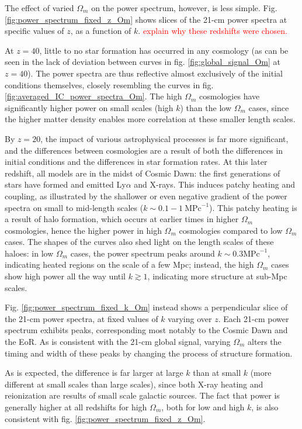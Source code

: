 \documentclass[floats,floatfix,showpacs,amssymb,prd,superscriptaddress,nofootinbib]{revtex4-2} %
\newcommand{\red}{\textcolor{red}}
\begin{document}
The effect of varied $\Omega_m$ on the power spectrum, however, is less simple. Fig. \ref{fig:power_spectrum_fixed_z_Om} shows slices of the 21-cm power spectra at specific values of $z$, as a function of $k$. \red{explain why these redshifts were chosen.}

At $z = 40$, little to no star formation has occurred in any cosmology (as can be seen in the lack of deviation between curves in fig. \ref{fig:global_signal_Om} at $z = 40$). The power spectra are thus reflective almost exclusively of the initial conditions themselves, closely resembling the curves in fig. \ref{fig:averaged_IC_power_spectra_Om}.
The high $\Omega_m$ cosmologies have significantly higher power on small scales (high $k$) than the low $\Omega_m$ cases, since the higher matter density enables more correlation at these smaller length scales. 

By $z = 20$, the impact of various astrophysical processes is far more significant, and the differences between cosmologies are a result of both the differences in initial conditions and the differences in star formation rates. At this later redshift, all models are in the midst of Cosmic Dawn: the first generations of stars have formed and emitted Ly$\alpha$ and X-rays. This induces patchy heating and coupling, as illustrated by the shallower or even negative gradient of the power spectra on small to mid-length scales ($k \sim 0.1 - 1 ~\text{MPc}^{-1}$). This patchy heating is a result of halo formation, which occurs at earlier times in higher $\Omega_m$ cosmologies, hence the higher power in high $\Omega_m$ cosmologies compared to low $\Omega_m$ cases. The shapes of the curves also shed light on the length scales of these haloes: in low $\Omega_m$ cases, the power spectrum peaks around $k \sim 0.3 \text{MPc}^{-1}$, indicating heated regions on the scale of a few Mpc; instead, the high $\Omega_m$ cases show high power all the way until $k \gtrsim 1$, indicating more structure at sub-Mpc scales. 



Fig. \ref{fig:power_spectrum_fixed_k_Om} instead shows a perpendicular slice of the 21-cm power spectra, at fixed values of $k$ varying over $z$. Each 21-cm power spectrum exhibits peaks, corresponding most notably to the Cosmic Dawn and the EoR. As is consistent with the 21-cm global signal, varying $\Omega_m$ alters the timing and width of these peaks by changing the process of structure formation.


As is expected, the difference is far larger at large $k$ than at small $k$ (more different at small scales than large scales), since both X-ray heating and reionization are results of small scale galactic sources. The fact that power is generally higher at all redshifts for high $\Omega_m$, both for low and high $k$, is also consistent with fig. \ref{fig:power_spectrum_fixed_z_Om}.
\end{document}
